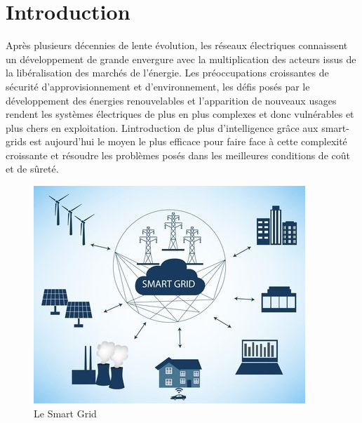 \section*{Introduction}
Après plusieurs décennies de lente évolution, les réseaux électriques connaissent un développement
de grande envergure avec la multiplication des acteurs issus de la libéralisation des marchés
de l’énergie. Les préoccupations croissantes de sécurité d’approvisionnement et d’environnement,
les défis posés par le développement des énergies renouvelables et l’apparition de nouveaux usages
rendent les systèmes électriques de plus en plus complexes et donc vulnérables et plus chers en
exploitation. Lintroduction de plus d’intelligence grâce aux smart-grids est aujourd’hui le moyen
le plus efficace pour faire face à cette complexité croissante et résoudre les problèmes posés dans
les meilleures conditions de coût et de sûreté.

\begin{figure}[h]
	\centering
    \includegraphics[scale=0.6]{img/part2/1.1}
    \caption{Le Smart Grid}
\end{figure}
